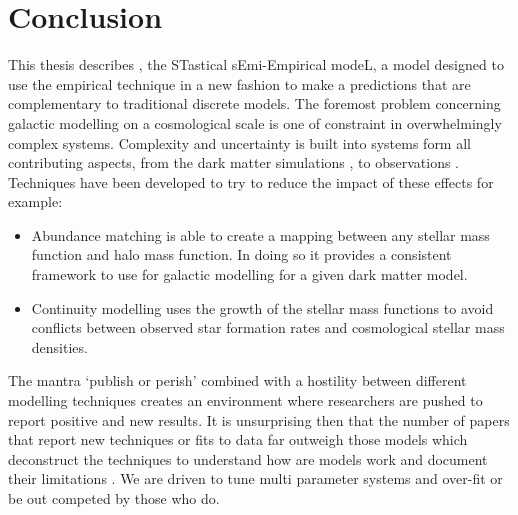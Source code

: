 
\chapter{Conclusion} %
\label{Chapter:Conclusion}

This thesis describes \steel, the STastical sEmi-Empirical modeL, a model designed to use the empirical technique in a new fashion to make a predictions that are complementary to traditional discrete models. The foremost problem concerning galactic modelling on a cosmological scale is one of constraint in overwhelmingly complex systems. Complexity and uncertainty is built into systems form all contributing aspects, from the dark matter simulations \cite[e.g.]{vandenBosch2018DisruptionFiction}, to observations \cite[e.g.]{Bernardi2017ComparingLight, Lapi2017StellarEquation, Leja2019AnSurvey}. Techniques have been developed to try to reduce the impact of these effects for example:
\begin{itemize}
    \item Abundance matching is able to create a mapping between any stellar mass function and halo mass function. In doing so it provides a consistent framework to use for galactic modelling for a given dark matter model.
    \item Continuity modelling uses the growth of the stellar mass functions to avoid conflicts between observed star formation rates and cosmological stellar mass densities. 
\end{itemize}

The mantra `publish or perish' combined with a hostility between different modelling techniques creates an environment where researchers are pushed to report positive and new results. It is unsurprising then that the number of papers that report new techniques or fits to data far outweigh those models which deconstruct the techniques to understand how are models work and document their limitations \cite[e.g.][]{vandenBosch2017DissectingSimulation, vandenBosch2018DisruptionFiction, Asquith2018CosmicModels}. We are driven to tune multi parameter systems and over-fit or be out competed by those who do.

